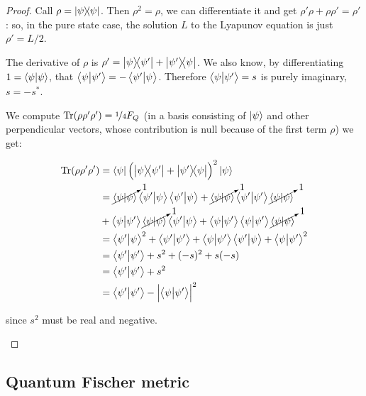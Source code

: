 \documentclass[main.tex]{subfiles}
\begin{document}
\begin{proof}

Call \( \rho = \ketbra{\psi} \). Then \(\rho ^2 = \rho\), we can differentiate it and get
\( \rho' \rho + \rho \rho' = \rho' \): so, in the pure state case, the solution \(L\) to the Lyapunov equation is just \( \rho ' = L/2 \).

\begin{bluebox}

  The derivative of \( \rho \) is \( \rho' = \ketbra{\psi}{\psi'} + \ketbra{\psi'}{\psi} \).
  We also know, by differentiating \(1 = \braket{\psi}{\psi} \), that \(\braket{\psi}{\psi'} = - \braket{\psi'}{\psi} \). Therefore \(\braket{\psi}{\psi'} = s\) is purely imaginary, \(s = -s^*\).

  We compute \( \Tr(\rho \rho' \rho') = \frac[i]{1}{4} F_Q\) (in a basis consisting of \(\ket{\psi } \) and other perpendicular vectors, whose contribution is null because of the first term \(\rho\)) we get:

\begin{subequations}
\begin{align}
   \operatorname*{Tr}(\rho \rho' \rho')
   &= \bra{\psi} \qty(\ketbra{\psi}{\psi'} + \ketbra{\psi'}{\psi})^2 \ket{\psi}   \\
   &= \cancelto{1}{\braket{\psi}{\psi}}\braket{\psi'}{\psi}\braket{\psi'}{\psi}
   + \cancelto{1}{\braket{\psi}{\psi}}\braket{\psi'}{\psi'}\cancelto{1}{\braket{\psi}{\psi}} \nonumber \\
   &+ \braket{\psi}{\psi'}\cancelto{1}{\braket{\psi}{\psi}}\braket{\psi'}{\psi}
   + \braket{\psi}{\psi'}\braket{\psi}{\psi'}\cancelto{1}{\braket{\psi}{\psi}} \\
   &= \braket{\psi'}{\psi}^2
   + \braket{\psi'}{\psi'} + \braket{\psi}{\psi'}\braket{\psi'}{\psi}
   + \braket{\psi}{\psi'}^2  \\
   &= \braket{\psi'}{\psi'} + s^2 + (-s)^2 + s(-s)  \\
   &= \braket{\psi'}{\psi'} + s^2  \\
   &= \braket{\psi'}{\psi'} - \abs{\braket{\psi}{\psi'}}^2
\end{align}
\end{subequations}

since \(s^2 \) must be real and negative.

\end{bluebox}
\end{proof}

\subsection{Quantum Fischer metric}
\end{document}
